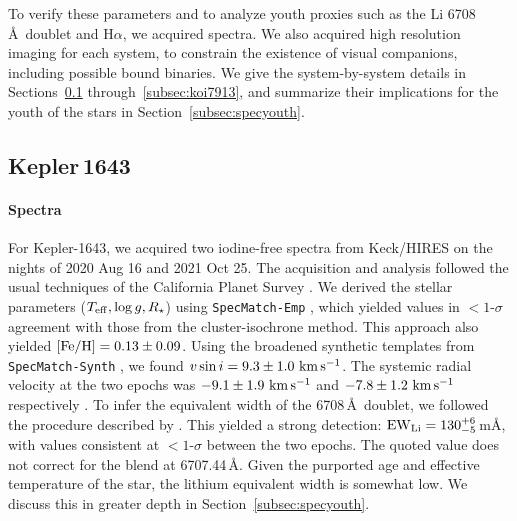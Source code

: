 \documentclass[12pt,twocolumn,tighten,linenumbers,trackchanges]{aastex63}
\newcommand{\mkms}{{\rm \,km\,s^{-1}}}  %
\begin{document}
To verify these parameters and to analyze youth
proxies such as the Li 6708\,\AA\ doublet and H$\alpha$, we acquired
spectra.  We also acquired high resolution imaging for each system, to
constrain the existence of visual companions, including possible bound
binaries.  We give the system-by-system details in Sections~\ref{subsec:kep1643}
through~\ref{subsec:koi7913}, and summarize their implications for
the youth of the stars in Section~\ref{subsec:specyouth}.

\subsection{Kepler\,1643}
\label{subsec:kep1643}

\paragraph{Spectra}
For Kepler-1643, we acquired two iodine-free spectra from Keck/HIRES
on the nights of 2020 Aug 16 and 2021 Oct 25.  The acquisition and
analysis followed the usual techniques of the California Planet Survey
\citep{howard_cps_2010}.  We derived the stellar parameters ($T_{\rm
eff}, \log g, R_\star$) using \texttt{SpecMatch-Emp}
\citep{yee_SM_2017}, which yielded values in $<$$1$-$\sigma$ agreement
with those from the cluster-isochrone method.  This approach also
yielded $[{\rm Fe/H}]=0.13 \pm 0.09$.  Using the broadened synthetic
templates
 from \texttt{SpecMatch-Synth} \citep{petigura_cksi_2017}, we
found $v\sin i = 9.3 \pm 1.0\,\mkms$.  The systemic radial velocity at
the two epochs was $-9.1 \pm 1.9\,\mkms$ and $-7.8\pm 1.2\,\mkms$
respectively \citep{chubak_2012}.  To infer the equivalent width of
the  6708\,\AA\ doublet, we followed the procedure
described by \citet{bouma_2021_ngc2516}.  This yielded a strong
detection: ${\rm EW}_{\rm Li} = 130^{+6}_{-5}$\,m\AA, with values
consistent at $<$$1$-$\sigma$ between the two epochs.   The quoted
value does not correct for the  blend at 6707.44\,\AA.  Given the purported age and
effective temperature of the star, the lithium equivalent width is
somewhat low.  We discuss this in greater depth in
Section~\ref{subsec:specyouth}.
\end{document}
